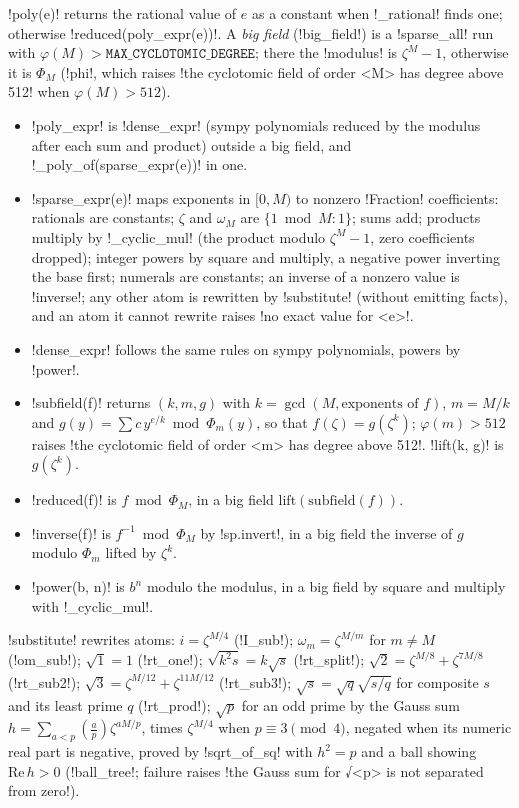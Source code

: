 {{{\lexpy!poly(e)! returns the rational value of $e$ as a constant when \lexpy!_rational! finds one;
otherwise \lexpy!reduced(poly_expr(e))!. A \emph{big field} (\lexpy!big_field!) is a
\lexpy!sparse_all! run with $\varphi(M) > \mathtt{MAX\_CYCLOTOMIC\_DEGREE}$; there the
\lexpy!modulus! is $\zeta^M - 1$, otherwise it is $\Phi_M$ (\lexpy!phi!, which raises
\lexcode!the cyclotomic field of order <M> has degree above 512! when $\varphi(M) > 512$).
\begin{itemize}
\item \lexpy!poly_expr! is \lexpy!dense_expr! (sympy polynomials reduced by the modulus after each
sum and product) outside a big field, and \lexpy!_poly_of(sparse_expr(e))! in one.
\item \lexpy!sparse_expr(e)! maps exponents in $[0, M)$ to nonzero \lexpy!Fraction! coefficients:
rationals are constants; $\zeta$ and $\omega_M$ are $\{1 \bmod M: 1\}$; sums add; products
multiply by \lexpy!_cyclic_mul! (the product modulo $\zeta^M - 1$, zero coefficients dropped);
integer powers by square and multiply, a negative power inverting the base first; numerals are
constants; an inverse of a nonzero value is \lexpy!inverse!; any other atom is rewritten by
\lexpy!substitute! (without emitting facts), and an atom it cannot rewrite raises
\lexcode!no exact value for <e>!.
\item \lexpy!dense_expr! follows the same rules on sympy polynomials, powers by \lexpy!power!.
\item \lexpy!subfield(f)! returns $(k, m, g)$ with $k = \gcd(M, \text{exponents of } f)$,
$m = M/k$ and $g(y) = \sum c\,y^{e/k} \bmod \Phi_m(y)$, so that $f(\zeta) = g(\zeta^k)$;
$\varphi(m) > 512$ raises \lexcode!the cyclotomic field of order <m> has degree above 512!.
\lexpy!lift(k, g)! is $g(\zeta^k)$.
\item \lexpy!reduced(f)! is $f \bmod \Phi_M$, in a big field $\mathrm{lift}(\mathrm{subfield}(f))$.
\item \lexpy!inverse(f)! is $f^{-1} \bmod \Phi_M$ by \lexpy!sp.invert!, in a big field the inverse of
$g$ modulo $\Phi_m$ lifted by $\zeta^k$.
\item \lexpy!power(b, n)! is $b^n$ modulo the modulus, in a big field by square and multiply with
\lexpy!_cyclic_mul!.
\end{itemize}
\lexpy!substitute! rewrites atoms: $i = \zeta^{M/4}$ (\lexlean!I_sub!); $\omega_m = \zeta^{M/m}$ for
$m \ne M$ (\lexlean!om_sub!); $\sqrt1 = 1$ (\lexlean!rt_one!); $\sqrt{k^2s} = k\sqrt s$
(\lexlean!rt_split!); $\sqrt2 = \zeta^{M/8}+\zeta^{7M/8}$ (\lexlean!rt_sub2!);
$\sqrt3 = \zeta^{M/12}+\zeta^{11M/12}$ (\lexlean!rt_sub3!); $\sqrt{s} = \sqrt q\sqrt{s/q}$ for
composite $s$ and its least prime $q$ (\lexlean!rt_prod!); $\sqrt p$ for an odd prime by the Gauss
sum~\cite{berndt1998gauss} $h = \sum_{a<p} \left(\frac ap\right)\zeta^{aM/p}$, times
$\zeta^{M/4}$ when $p\equiv 3\pmod 4$, negated when its numeric real part is negative, proved by
\lexlean!sqrt_of_sq! with $h^2 = p$ and a ball showing $\mathrm{Re}\,h > 0$ (\lexpy!ball_tree!;
failure raises \lexcode!the Gauss sum for √<p> is not separated from zero!).

}}}
